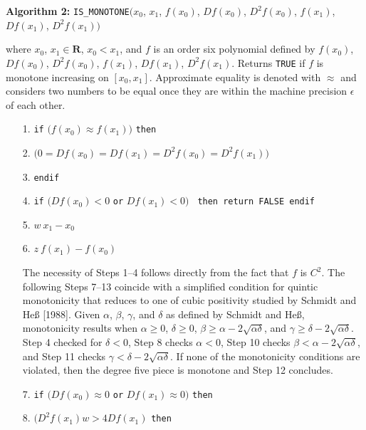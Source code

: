 \vskip 5mm
{\parindent 0mm
{\bf Algorithm 2:}
{\tt IS\_MONOTONE}$\bigl(x_0$, $x_1$, $f(x_0)$, $Df(x_0)$,
$D^2f(x_0)$, $f(x_1)$, $Df(x_1)$, $D^2f(x_1) \bigr)$

\nobreak

where $x_0$, $x_1 \in {\mathbf R}$, $x_0 < x_1$, and $f$ is an order six
polynomial defined by $f(x_0)$, $Df(x_0)$, $D^2f(x_0)$, $f(x_1)$,
$Df(x_1)$, $D^2f(x_1)$. Returns {\tt TRUE} if $f$ is monotone
increasing on $[x_0,x_1]$. Approximate equality is denoted with
$\approx$ and considers two numbers to be equal once they are within
the machine precision $\epsilon$ of each other.

}
{\parindent=6mm
\begin{itemize}
\item[1.]{ {\tt if} $\bigl(f(x_0) \approx f(x_1)\bigr)$ {\tt then}}
\item[2.]{  $\bigl( 0 = Df(x_0) = Df(x_1)
  = D^2f(x_0) = D^2f(x_1) \bigr)$}
\item[3.]{ {\tt endif}}
\item[4.]{ {\tt if} $\bigl(Df(x_0) < 0$ {\tt or} $Df(x_1) < 0\bigr)$ {\tt
  then return FALSE endif}}
\item[5.]{ $w \: x_1 - x_0$}
\item[6.]{ $z \: f(x_1) - f(x_0)$
}
\item[]{ {The necessity of Steps 1--4 follows directly from the
  fact that $f$ is $C^2$. The following Steps 7--13 coincide with a
  simplified condition for quintic monotonicity that reduces to one of
  cubic positivity studied by Schmidt and He{\ss} [1988]. Given
  $\alpha$, $\beta$, $\gamma$, and $\delta$ as defined by Schmidt and
  He{\ss}, monotonicity results when $\alpha \geq 0$, $\delta \geq 0$,
  $\beta \geq \alpha - 2 \sqrt{\alpha \delta}$, and $\gamma \geq
  \delta - 2 \sqrt{\alpha \delta}$.  Step 4 checked for $\delta < 0$,
  Step 8 checks $\alpha < 0$, Step 10 checks $\beta < \alpha - 2
  \sqrt{\alpha \delta}$, and Step 11 checks $\gamma < \delta - 2
  \sqrt{\alpha \delta}$. If none of the monotonicity conditions are
  violated, then the degree five piece is monotone and Step 12
  concludes.}
}
\item[7.]{ {\tt if} $\bigl(Df(x_0) \approx 0$ {\tt or} $Df(x_1) \approx
0\bigr)$ {\tt then}}
\item[8.]{  $\bigl(D^2f(x_1)w > 4Df(x_1)$ {\tt then
}}
\end{itemize}}
